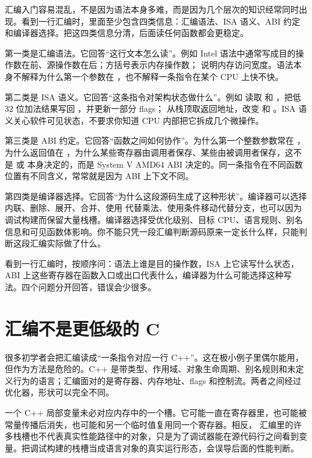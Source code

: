 汇编入门容易混乱，不是因为语法本身多难，而是因为几个层次的知识经常同时出现。看到一行汇编时，里面至少包含四类信息：汇编语法、ISA 语义、ABI 约定和编译器选择。把这四类信息分清，后面读任何函数都会更稳定。

第一类是汇编语法。它回答“这行文本怎么读”。例如 Intel 语法中通常写成目的操作数在前、源操作数在后；方括号表示内存操作数； 说明内存访问宽度。语法本身不解释为什么第一个参数在 ，也不解释一条指令在某个 CPU 上快不快。

第二类是 ISA 语义。它回答“这条指令对架构状态做什么”。例如  读取  和 ，把低 32 位加法结果写回 ，并更新一部分 flags； 从栈顶取返回地址，改变  和 。ISA 语义关心软件可见状态，不要求你知道 CPU 内部把它拆成几个微操作。

第三类是 ABI 约定。它回答“函数之间如何协作”。为什么第一个整数参数常在 ，为什么返回值在 ，为什么某些寄存器由调用者保存、某些由被调用者保存，这不是  或  本身决定的，而是 System V AMD64 ABI 决定的。同一条指令在不同函数位置有不同含义，常常就是因为 ABI 上下文不同。

第四类是编译器选择。它回答“为什么这段源码生成了这种形状”。编译器可以选择内联、删除、展开、合并、使用  代替乘法、使用条件移动代替分支，也可以因为调试构建而保留大量栈槽。编译器选择受优化级别、目标 CPU、语言规则、别名信息和可见函数体影响。你不能只凭一段汇编判断源码原来一定长什么样，只能判断这段汇编实际做了什么。

\begin{mentalmodel}
看到一行汇编时，按顺序问：语法上谁是目的操作数，ISA 上它读写什么状态，ABI 上这些寄存器在函数入口或出口代表什么，编译器为什么可能选择这种写法。四个问题分开回答，错误会少很多。
\end{mentalmodel}

\section{汇编不是更低级的 C}

很多初学者会把汇编读成“一条指令对应一行 C++”。这在极小例子里偶尔能用，但作为方法是危险的。C++ 是带类型、作用域、对象生命周期、别名规则和未定义行为的语言；汇编面对的是寄存器、内存地址、flags 和控制流。两者之间经过优化器，形状可以完全不同。

一个 C++ 局部变量未必对应内存中的一个槽。它可能一直在寄存器里，也可能被常量传播后消失，也可能和另一个临时值复用同一个寄存器。相反， 汇编里的许多栈槽也不代表真实性能路径中的对象，只是为了调试器能在源代码行之间看到变量。把调试构建的栈槽当成语言对象的真实运行形态，会误导后面的性能判断。

